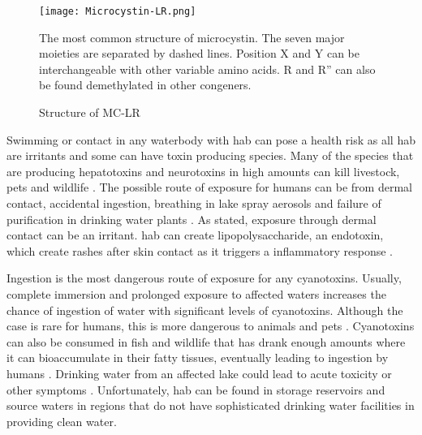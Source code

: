 \begin{figure}[!h]
   \texttt{[image: Microcystin-LR.png]}
   \caption{Structure of MC-LR}
   \label{fig:structure1}
   \begin{flushleft}
   The most common structure of microcystin. The seven major moieties are separated by dashed lines. Position X and Y can be interchangeable with other variable amino acids. R and R'' can also be found demethylated in other congeners. 
     \end{flushleft}
 \end{figure}

 \clearpage

Swimming or contact in any waterbody with \gls{hab} can pose a health risk as all \gls{hab} are irritants and some can have toxin producing species. Many of the species that are producing hepatotoxins and neurotoxins in high amounts can kill livestock, pets and wildlife \cite{anderson_harmful_2002}. The possible route of exposure  for humans can be from dermal contact, accidental ingestion, breathing in lake spray aerosols and failure of purification in drinking water plants \cite{may_aerosol_2018,codd_cyanobacterial_1999}. As stated, exposure through dermal contact can be an irritant. \gls{hab} can create lipopolysaccharide, an endotoxin, which create rashes after skin contact as it triggers a inflammatory response \cite{ moore_richard_cyanobacterial_1993}.

Ingestion is the most dangerous route of exposure for any cyanotoxins. Usually, complete immersion and prolonged exposure to affected waters increases the chance of ingestion of water with significant levels of cyanotoxins. Although the case is rare for humans, this is more dangerous to animals and pets \cite{koreiviene_cyanotoxin_2014}. Cyanotoxins can also be consumed in fish and wildlife that has drank enough amounts where it can bioaccumulate in their fatty tissues, eventually leading to ingestion by humans \cite{saoudi_management_2017}. Drinking water from an affected lake could  lead to acute toxicity or other symptoms \cite{monks_potent_2007}. Unfortunately, \gls{hab} can be found in storage reservoirs and source waters in regions that do not have sophisticated drinking water facilities in providing clean water. 


